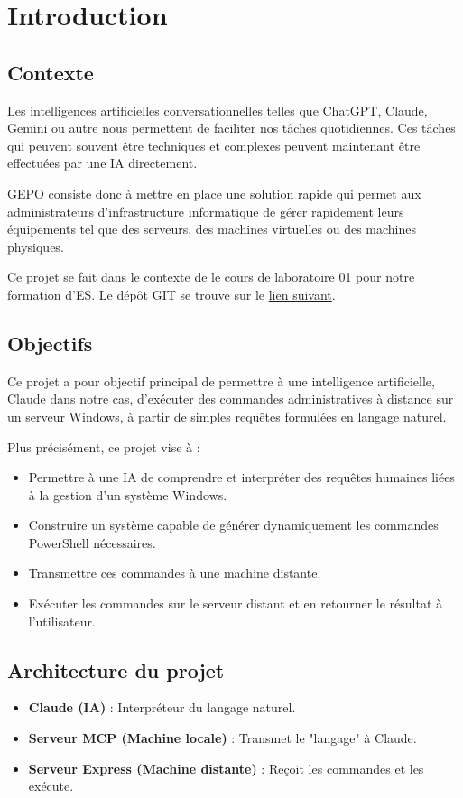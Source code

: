 
\section{Introduction}

\subsection*{Contexte}
Les intelligences artificielles conversationnelles telles que ChatGPT, Claude, Gemini ou autre nous permettent de faciliter nos tâches quotidiennes. Ces tâches qui peuvent souvent être techniques et complexes peuvent maintenant être effectuées par une IA directement. 

GEPO consiste donc à mettre en place une solution rapide qui permet aux administrateurs d'infrastructure informatique de gérer rapidement leurs équipements tel que des serveurs, des machines virtuelles ou des machines physiques. 

Ce projet se fait dans le contexte de le cours de laboratoire 01 pour notre formation d'ES. Le dépôt GIT se trouve sur le \href{https://github.com/HerdiiiL/gepo}{lien suivant}.

\subsection*{Objectifs}
Ce projet a pour objectif principal de permettre à une intelligence artificielle, Claude dans notre cas, d’exécuter des commandes administratives à distance sur un serveur Windows, à partir de simples requêtes formulées en langage naturel.

Plus précisément, ce projet vise à :
\begin{itemize}
    \item Permettre à une IA de comprendre et interpréter des requêtes humaines liées à la gestion d’un système Windows.
    \item Construire un système capable de générer dynamiquement les commandes PowerShell nécessaires.
    \item Transmettre ces commandes à une machine distante.
    \item Exécuter les commandes sur le serveur distant et en retourner le résultat à l’utilisateur.
\end{itemize}

\subsection*{Architecture du projet}
\begin{itemize}
  \item \textbf{Claude (IA)} : Interpréteur du langage naturel.
  \item \textbf{Serveur MCP (Machine locale)} : Transmet le "langage" à Claude.
  \item \textbf{Serveur Express (Machine distante)} : Reçoit les commandes et les exécute.
\end{itemize}

